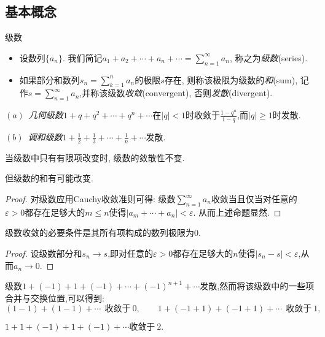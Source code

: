 \subsection{基本概念}

\begin{definition}{级数}
	\vspace{-2em}
	\begin{itemize}
		\item 设数列$\{ a_n \}$. 我们简记$a_1+a_2+\cdots +a_n + \cdots = \sum_{n=1}^{\infty} a_n$, 称之为\textit{级数}(series).
		\item 如果部分和数列$s_n=\sum_{k=1}^n a_n$的极限$s$存在, 则称该极限为级数的\textit{和}(sum), 记作$s=\sum_{n=1}^{\infty} a_n$,并称该级数\textit{收敛}(convergent), 否则\textit{发散}(divergent).
	\end{itemize}
\end{definition}

\begin{example}
	$(a)$~\textit{几何级数}$1+q+q^2+\cdots +q^n+\cdots$在$|q|<1$时收敛于$\frac{1-q^n}{1-q}$,而$|q|\geq 1$时发散.
	
	$(b)$~\textit{调和级数}$1+\frac{1}{2}+\frac{1}{3}+\cdots + \frac{1}{n} + \cdots$发散.
\end{example}

\begin{proposition}{}
	当级数中只有有限项改变时, 级数的敛散性不变.
\end{proposition}
\begin{remark}
	但级数的和有可能改变. 
\end{remark}
\begin{proof}
	对级数应用Cauchy收敛准则可得: 级数$\sum_{n=1}^{\infty} a_n$收敛当且仅当对任意的$\varepsilon >0$都存在足够大的$m \leq n$使得$|a_m + \cdots + a_n|<\varepsilon$. 从而上述命题显然.
\end{proof}

\begin{proposition}{}
	级数收敛的必要条件是其所有项构成的数列极限为$0$.
\end{proposition}
\begin{proof}
	设级数部分和$s_n \to s$,即对任意的$\varepsilon >0$都存在足够大的$n$使得$|s_n-s|<\varepsilon$,从而$a_n \to 0$.
\end{proof}

\begin{example}
	级数$1+(-1)+1+(-1)+\cdots +(-1)^{n+1}+\cdots$发散,然而将该级数中的一些项合并与交换位置,可以得到:
	$$(1-1)+(1-1)+\cdots ~~\textit{收敛于}~0, \qquad 1+(-1+1)+(-1+1)+\cdots ~~\textit{收敛于}~1,$$
	\begin{center}
		$1+1+(-1)+1+(-1)+\cdots \textit{收敛于}~2.$
	\end{center}
\end{example}

